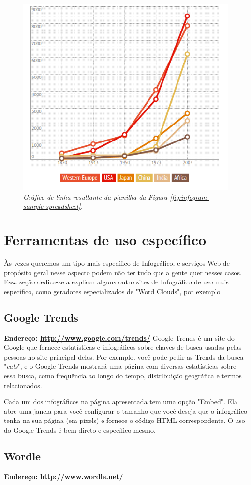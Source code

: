 \documentclass[12pt,onecolumn]{article}
\begin{document}
    \begin{figure}[ht]
      \centering
      \includegraphics[width=.9\linewidth]{infogram-sample-chart.png}
      \caption{
        \footnotesize
        \it
        Gráfico de linha resultante da planilha da Figura
        \ref{fig:infogram-sample-spreadsheet}.
      }
      \label{fig:infogram-sample-chart}
    \end{figure}

\clearpage
\section{Ferramentas de uso específico}
  Às vezes queremos um tipo mais específico de Infográfico, e serviços Web de
  propósito geral nesse aspecto podem não ter tudo que a gente quer nesses
  casos. Essa seção dedica-se a explicar alguns outro sites de Infográfico de
  uso mais específico, como geradores especializados de "Word Clouds", por
  exemplo.

  \subsection{Google Trends}
    \textbf{Endereço: \url{http://www.google.com/trends/}}
    Google Trends é um site do Google que fornece estatísticas e infográficos
    sobre chaves de busca usadas pelas pessoas no site principal deles. Por
    exemplo, você pode pedir as Trends da busca "\textit{cats}", e o Google
    Trends mostrará uma página com diversas estatísticas sobre essa busca,
    como frequência ao longo do tempo, distribuição geográfica e termos
    relacionados.
    
    Cada um dos infográficos na página apresentada tem uma opção "Embed". Ela
    abre uma janela para você configurar o tamanho que você deseja que o
    infográfico tenha na sua página (em pixels) e fornece o código HTML
    correspondente. O uso do Google Trends é bem direto e específico mesmo.

  \subsection{Wordle}
    \textbf{Endereço: \url{http://www.wordle.net/}}
    
\end{document}
